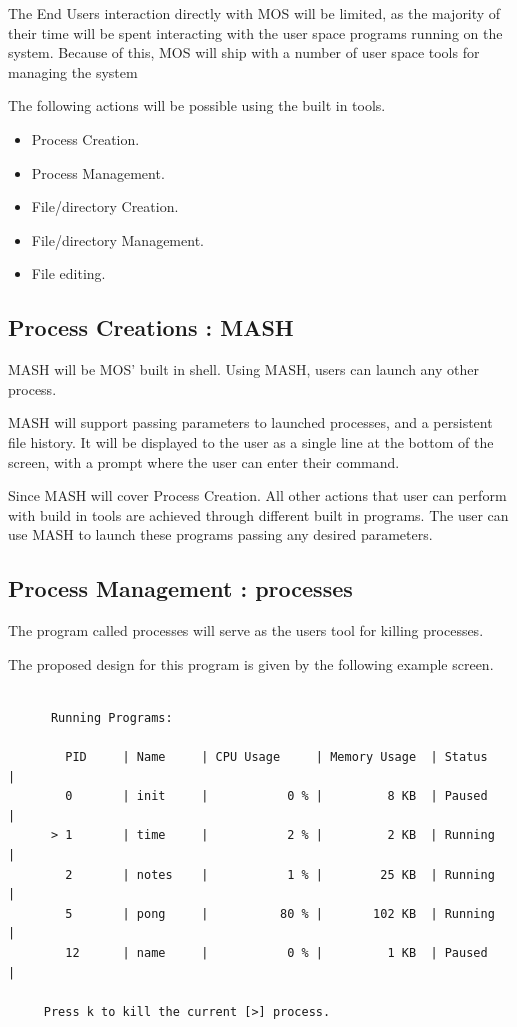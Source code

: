 \documentclass[a4paper]{report}
\begin{document}
The End Users interaction directly with MOS will be limited, as the majority of their time will be spent interacting with the user space programs running on the system. Because of this, MOS will ship with a number of user space tools for managing the system

The following actions will be possible using the built in tools.
\begin{itemize}
\item Process Creation.
\item Process Management.
\item File/directory Creation.
\item File/directory Management.
\item File editing.
\end{itemize}

\subsection {Process Creations : MASH}

MASH will be MOS' built in shell. Using MASH, users can launch any other process.

MASH will support passing parameters to launched processes, and a persistent file history. It will be displayed to the user as a single line at the bottom of the screen, with a \> prompt where the user can enter their command.

Since MASH will cover Process Creation. All other actions that user can perform with build in tools are achieved through different built in programs. The user can use MASH to launch these programs passing any desired parameters.

\subsection{Process Management : processes}

The program called processes will serve as the users tool for killing processes.

The proposed design for this program is given by the following example screen.

{\ttfamily \small
  \begin{framed}
    \begin{verbatim}

      Running Programs:

        PID     | Name     | CPU Usage     | Memory Usage  | Status     |
        0       | init     |           0 % |         8 KB  | Paused     |
      > 1       | time     |           2 % |         2 KB  | Running    |
        2       | notes    |           1 % |        25 KB  | Running    |
        5       | pong     |          80 % |       102 KB  | Running    |
        12      | name     |           0 % |         1 KB  | Paused     |

     Press k to kill the current [>] process.

    \end{verbatim}
  \end{framed}
}
\end{document}

